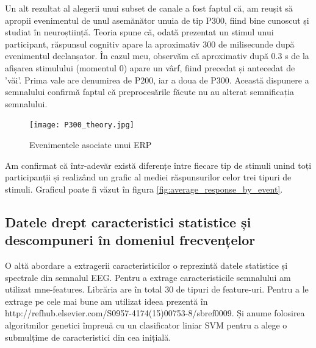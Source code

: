 Un alt rezultat al alegerii unui subset de canale a fost faptul că, am reușit să apropii evenimentul de unul asemănător unuia de tip P300\cite{P300}, fiind bine cunoscut și studiat în neuroștiință. Teoria spune că, odată prezentat un stimul unui participant, răspunsul cognitiv apare la aproximativ 300 de milisecunde după evenimentul declanșator. În cazul meu, observăm că aproximativ după 0.3 s de la afișarea stimulului (momentul 0) apare un vârf, fiind precedat și antecedat de 'văi'. Prima vale are denumirea de P200, iar a doua de P300. Această dispunere a semnalului confirmă faptul că preprocesările făcute nu au alterat semnificația semnalului. %

\vspace{1em}
\begin{figure}[h]
    \centering
    \texttt{[image: P300\_theory.jpg]}
    \caption{Evenimentele asociate unui ERP\cite{P300_image}}
    \label{fig:enter-label}
\end{figure}

Am confirmat că într-adevăr există diferențe între fiecare tip de stimuli unind toți participanții și realizând un grafic al mediei răspunsurilor celor trei tipuri de stimuli. Graficul poate fi văzut în figura \ref{fig:average_response_by_event}.

\subsection{Datele drept caracteristici statistice și descompuneri în domeniul frecvențelor}

O altă abordare a extragerii caracteristicilor o reprezintă datele statistice și spectrale din semnalul EEG. Pentru a extrage caracteristicile semnalului am utilizat mne-features\cite{mne-features}. Librăria are în total 30 de tipuri de feature-uri. Pentru a le extrage pe cele mai bune am utilizat ideea prezentă în http://refhub.elsevier.com/S0957-4174(15)00753-8/sbref0009. Și anume folosirea algoritmilor genetici împreuă cu un clasificator liniar SVM pentru a alege o submulțime de caracteristici din cea inițială. 

